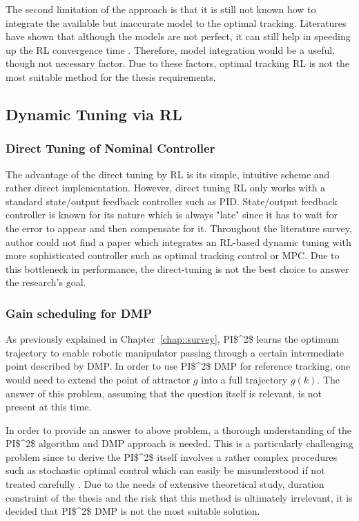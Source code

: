 The second limitation of the approach is that it is still not known how to integrate the available but inaccurate model to the optimal tracking. Literatures have shown that although the models are not perfect, it can still help in speeding up the \ac {RL} convergence time \cite{Brujeni5669655} \cite{Grondman6096441}. Therefore, model integration would be a useful, though not necessary factor. Due to these factors, optimal tracking \ac {RL} is not the most suitable method for the thesis requirements.

\subsection{Dynamic Tuning via \ac{RL}}
\subsubsection{Direct Tuning of Nominal Controller}
The advantage of the direct tuning by \ac{RL} is its simple, intuitive scheme and rather direct implementation. However, direct tuning \ac{RL} only works with a standard state/output feedback controller such as \ac{PID}. State/output feedback controller is known for its nature which is always "late" since it has to wait for the error to appear and then compensate for it. Throughout the literature survey, author could not find a paper which integrates an \ac{RL}-based dynamic tuning with more sophisticated controller such as optimal tracking control or \ac {MPC}. Due to this bottleneck in performance, the direct-tuning is not the best choice to answer the research's goal.
\subsubsection{Gain scheduling for \ac{DMP}}
As previously explained in Chapter~\ref{chap::survey}, \ac{PI$^2$} learns the optimum trajectory to enable robotic manipulator passing through a certain intermediate point described by \ac{DMP}. In order to use \ac{PI$^2$} \ac{DMP} for reference tracking, one would need to extend the point of attractor $g$ into a full trajectory $g(k)$. The answer of this problem, assuming that the question itself is relevant, is not present at this time.

In order to provide an answer to above problem, a thorough understanding of the \ac{PI$^2$} algorithm and \ac {DMP} approach is needed. This is a particularly challenging problem since to derive the \ac{PI$^2$} itself involves a rather complex procedures such as stochastic optimal control which can easily be misunderstood if not treated carefully \cite{Buchli2010}. Due to the needs of extensive theoretical study, duration constraint of the thesis and the risk that this method is ultimately irrelevant, it is decided that \ac {PI$^2$} \ac{DMP} is not the most suitable solution.

